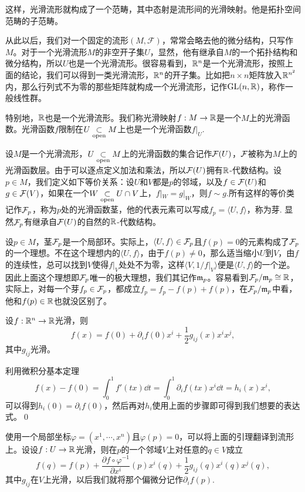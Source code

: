 这样，光滑流形就构成了一个范畴，其中态射是流形间的光滑映射。他是拓扑空间范畴的子范畴。

从此以后，我们对一个固定的流形$(M,\mathscr{F})$，常常会略去他的微分结构，只写作$M$。对于一个光滑流形$M$的非空开子集$U$，显然，他有继承自$M$的一个拓扑结构和微分结构，所以$U$也是一个光滑流形。很容易看到，$\mathbb{R}^n$是一个光滑流形，按照上面的结论，我们可以得到一类光滑流形，$\mathbb{R}^n$的开子集。比如把$n\times n$矩阵放入$\mathbb{R}^{n^2}$内，那么行列式不为零的那些矩阵就构成一个光滑流形，记作$\mathrm{GL}(n,\mathbb{R})$，称作一般线性群。

特别地，$\mathbb{R}$也是一个光滑流形。我们称光滑映射$f:M\to \mathbb{R}$是一个$M$上的光滑函数。光滑函数$f$限制在$U\underset{\mathrm{open}}{\subset} M$上也是一个光滑函数$f|_U$.

\para 设$M$是一个光滑流形，$U\underset{\mathrm{open}}{\subset} M$上的光滑函数的集合记作$\mathcal{F}(U)$，$\mathcal{F}$被称为$M$上的光滑函数{\kaishu 层}。由于可以逐点定义加法和乘法，所以$\mathcal{F}(U)$拥有$\mathbb{R}$-代数结构。设$p\in M$，我们定义如下等价关系：设$U$和$V$都是$p$的邻域，以及$f\in \mathcal{F}(U)$和$g\in \mathcal{F}(V)$，如果在一个$W\underset{\mathrm{open}}{\subset} U\cap V$上，$f|_W=g|_W$，则$f\sim g$.所有这样的等价类记作$\mathcal{F}_p$，称为$p$处的光滑函数{\kaishu 茎}，他的代表元素可以写成$f_p=\langle U,f\rangle$，称为{\kaishu 芽}. 显然$\mathcal{F}_p$有继承自$\mathcal{F}(U)$的自然的$\mathbb{R}$-代数结构。

设$p\in M$，茎$\mathcal{F}_p$是一个局部环。实际上，$\langle U,f\rangle \in \mathcal{F}_p$且$f(p)= 0$的元素构成了$\mathcal{F}_p$的一个理想。不在这个理想内的$\langle U,f\rangle$，由于$f(p)\neq 0$，那么适当缩小$U$到$V$，由$f$的连续性，总可以找到$V$使得$f|_V$处处不为零，这样$\langle V,1/f|_V\rangle$便是$\langle U,f\rangle$的一个逆。因此上面这个理想即$\mathcal{F}_p$唯一的极大理想，我们其记作$\mathfrak{m}_p$。容易看到$\mathcal{F}_p/\mathfrak{m}_p\cong \mathbb{R}$，实际上，对每一个芽$f_p\in\mathcal{F}_p$，都成立$f_p=f_p-f(p)+f(p)$，在$\mathcal{F}_p/\mathfrak{m}_p$中看，他和$f(p)\in\mathbb{R}$也就没区别了。

\lem 设$f:\mathbb{R}^n\to \mathbb{R}$光滑，则
\[
	f(x)=f(0)+\partial_if(0)x^i+\frac{1}{2}g_{ij}(x)x^ix^j,
\]
其中$g_{ij}$光滑。

\proof 利用微积分基本定理
\[
	f(x)-f(0)=\int_0^1f'(tx)\dd t=\int_0^1\partial_i f(tx)x^i\dd t=h_i(x)x^i,
\]
可以得到$h_i(0)=\partial_i f(0)$，然后再对$h_i$使用上面的步骤即可得到我们想要的表达式。\qed

\para 使用一个局部坐标$\varphi=(x^1,\cdots,x^n)$且$\varphi(p)=0$，可以将上面的引理翻译到流形上。设设$f:U\to \mathbb{R}$光滑，则在$p$的一个邻域$V$上对任意的$q\in V$成立
\[
	f(q)=f(p)+\frac{\partial f\circ \varphi^{-1}}{\partial x^i}(p)x^i(q)+\frac{1}{2}g_{ij}(q)x^i(q)x^j(q),
\]
其中$g_{ij}$在$V$上光滑，以后我们就将那个偏微分记作$\partial_i f(p)$.


